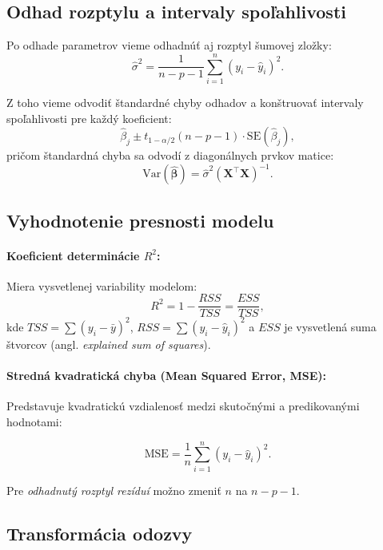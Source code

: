 \subsection{Odhad rozptylu a intervaly spoľahlivosti}

Po odhade parametrov vieme odhadnúť aj rozptyl šumovej zložky:
\begin{equation}
\hat{\sigma}^2 = \frac{1}{n - p - 1} \sum_{i=1}^{n} (y_i - \hat{y}_i)^2.
\end{equation}

Z toho vieme odvodiť štandardné chyby odhadov a konštruovať intervaly spoľahlivosti pre každý koeficient:
\begin{equation}
\hat{\beta}_j \pm t_{1 - \alpha/2}(n - p - 1) \cdot \mathrm{SE}(\hat{\beta}_j),
\end{equation}
pričom štandardná chyba sa odvodí z diagonálnych prvkov matice:
\[
\mathrm{Var}(\hat{\boldsymbol{\beta}}) = \hat{\sigma}^2 (\mathbf{X}^\top \mathbf{X})^{-1}.
\]

\subsection{Vyhodnotenie presnosti modelu}\label{subsec:presnost_modelu}

\paragraph{Koeficient determinácie $R^2$:} 
Miera vysvetlenej variability modelom:
\begin{equation}
R^2 = 1 - \frac{RSS}{TSS} = \frac{ESS}{TSS},
\end{equation}
kde $TSS = \sum (y_i - \bar{y})^2$, $RSS = \sum (y_i - \hat{y}_i)^2$ a $ESS$ je vysvetlená suma štvorcov (angl. \textit{explained sum of squares}).

\paragraph{Stredná kvadratická chyba (Mean Squared Error, MSE):}
Predstavuje kvadratickú vzdialenosť medzi skutočnými a predikovanými hodnotami:

\begin{equation}
\mathrm{MSE} = \frac{1}{n} \sum_{i=1}^n (y_i - \hat{y}_i)^2.
\end{equation}

Pre \textit{odhadnutý rozptyl rezíduí} možno zmeniť $n$ na $n - p - 1$.


\subsection{Transformácia odozvy}


